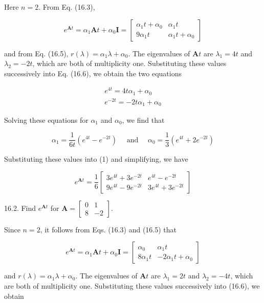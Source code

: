 \documentclass[10pt]{article}
\begin{document}
Here $n=2$. From Eq. (16.3),

\[
e^{\mathbf{A} t}=\alpha_{1} \mathbf{A} t+\alpha_{0} \mathbf{I}=\left[\begin{array}{cc}
\alpha_{1} t+\alpha_{0} & \alpha_{1} t  \tag{1}\\
9 \alpha_{1} t & \alpha_{1} t+\alpha_{0}
\end{array}\right]
\]

and from Eq. (16.5), $r(\lambda)=\alpha_{1} \lambda+\alpha_{0}$. The eigenvalues of $\mathbf{A} t$ are $\lambda_{1}=4 t$ and $\lambda_{2}=-2 t$, which are both of multiplicity one. Substituting these values successively into Eq. (16.6), we obtain the two equations

$$
\begin{gathered}
e^{4 t}=4 t \alpha_{1}+\alpha_{0} \\
e^{-2 t}=-2 t \alpha_{1}+\alpha_{0}
\end{gathered}
$$

Solving these equations for $\alpha_{1}$ and $\alpha_{0}$, we find that

$$
\alpha_{1}=\frac{1}{6 t}\left(e^{4 t}-e^{-2 t}\right) \quad \text { and } \quad \alpha_{0}=\frac{1}{3}\left(e^{4 t}+2 e^{-2 t}\right)
$$

Substituting these values into (1) and simplifying, we have

$$
e^{\mathbf{A} t}=\frac{1}{6}\left[\begin{array}{cc}
3 e^{4 t}+3 e^{-2 t} & e^{4 t}-e^{-2 t} \\
9 e^{4 t}-9 e^{-2 t} & 3 e^{4 t}+3 e^{-2 t}
\end{array}\right]
$$

16.2. Find $e^{\mathbf{A} t}$ for $\mathbf{A}=\left[\begin{array}{rr}0 & 1 \\ 8 & -2\end{array}\right]$.

Since $n=2$, it follows from Eqs. (16.3) and (16.5) that

\[
e^{\mathbf{A} t}=\alpha_{1} \mathbf{A} t+\alpha_{0} \mathbf{I}=\left[\begin{array}{cc}
\alpha_{0} & \alpha_{1} t  \tag{1}\\
8 \alpha_{1} t & -2 \alpha_{1} t+\alpha_{0}
\end{array}\right]
\]

and $r(\lambda)=\alpha_{1} \lambda+\alpha_{0}$. The eigenvalues of $\mathbf{A} t$ are $\lambda_{1}=2 t$ and $\lambda_{2}=-4 t$, which are both of multiplicity one. Substituting these values successively into (16.6), we obtain
\end{document}
